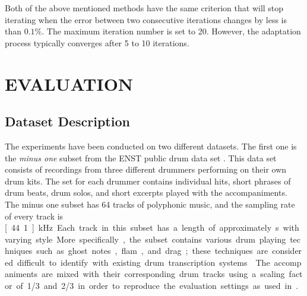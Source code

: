 \documentclass{article}
\begin{document}

Both of the above mentioned methods have the same criterion that will stop iterating when the error between two consecutive iterations changes by less is than $0.1\%$. The maximum iteration number is set to 20. However, the adaptation process typically converges after 5 to 10 iterations. 

\section{EVALUATION}\label{sec:Evaluation}
\subsection{Dataset Description}\label{subsec:data set description}
The experiments have been conducted on two different datasets. The first one is the \textit{minus one} subset from the ENST public drum data set \cite{gillet_enst-drums:_2006}. This data set consists of recordings from three different drummers performing on their own drum kits. The set for each drummer contains individual hits, short phrases of drum beats, drum solos, and short excerpts played with the accompaniments. The minus one subset has 64 tracks of polyphonic music, and the sampling rate of every track is \unit[44.1]{kHz}. Each track in this subset has a length of approximately \unit[70]{s} with varying style. More specifically, the subset contains various drum playing techniques such as ghost notes, flam, and drag; these techniques are considered difficult to identify with existing drum transcription systems\cite{gillet_transcription_2008}. The accompaniments are mixed with their corresponding drum tracks using a scaling factor of 1/3 and 2/3 in order to reproduce the evaluation settings as used in \cite{Paulus2009a}. %
 
\end{document}
